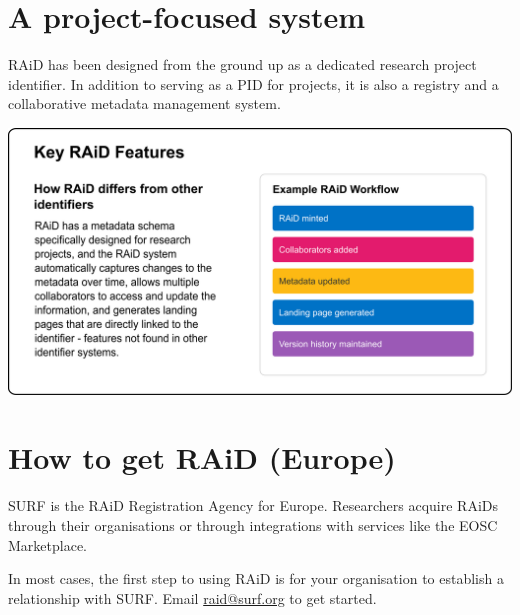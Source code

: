 \documentclass[a0,portrait]{a0poster}
\newenvironment{Figure}
  {\par\medskip\noindent\minipage{\linewidth}}
  {\endminipage\par\medskip}
\begin{document}
\begin{multicols}{3}

\color{ARDCPurple}
\section*{\LARGE A project-focused system}
\color{DarkGrey}
\large{
RAiD has been designed from the ground up as a dedicated research project identifier. In addition to serving as a PID for projects, it is also a registry and a collaborative metadata management system.
}

\vspace{0.5cm}

\begin{Figure}
  \centering
  \includegraphics[width=0.9\linewidth]{figures/raid-key-features.png}
  \label{key-features}
\end{Figure}


\vspace{-1cm}

\color{ARDCBlue}
\section*{\LARGE How to get RAiD (Europe)}
\color{DarkGrey}
\large{
SURF is the RAiD Registration Agency for Europe. Researchers acquire RAiDs through their organisations or through integrations with services like the EOSC Marketplace. 

In most cases, the first step to using RAiD is for your organisation to establish a relationship with SURF. Email \href{mailto:raid@surf.org}{raid@surf.org} to get started.

}
\end{multicols}
\end{document}

